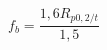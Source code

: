 \documentclass[12pt]{article}
\begin{document}
\begin{displaymath}
f_b=\frac{1,6R_{p0,2/t}}{1,5}
\end{displaymath}
\end{document}
